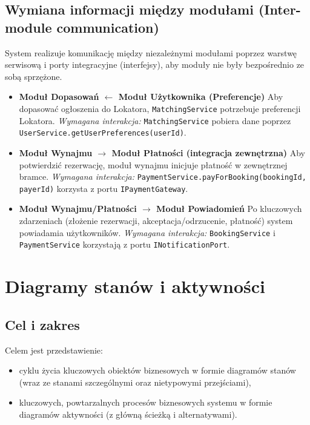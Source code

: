 \documentclass[11pt, a4paper]{article}
\begin{document}
\subsection{Wymiana informacji między modułami (Inter-module communication)}
System realizuje komunikację między niezależnymi modułami poprzez warstwę serwisową i porty integracyjne (interfejsy), aby moduły nie były bezpośrednio ze sobą sprzężone.

\begin{itemize}
    \item \textbf{Moduł Dopasowań $\leftarrow$ Moduł Użytkownika (Preferencje)}
    \newline
    Aby dopasować ogłoszenia do Lokatora, \texttt{MatchingService} potrzebuje preferencji Lokatora.
    \newline
    \textit{Wymagana interakcja:} \texttt{MatchingService} pobiera dane poprzez \texttt{UserService.getUserPreferences(userId)}.

    \item \textbf{Moduł Wynajmu $\rightarrow$ Moduł Płatności (integracja zewnętrzna)}
    \newline
    Aby potwierdzić rezerwację, moduł wynajmu inicjuje płatność w zewnętrznej bramce.
    \newline
    \textit{Wymagana interakcja:} \texttt{PaymentService.payForBooking(bookingId, payerId)} korzysta z portu \texttt{IPaymentGateway}.

    \item \textbf{Moduł Wynajmu/Płatności $\rightarrow$ Moduł Powiadomień}
    \newline
    Po kluczowych zdarzeniach (złożenie rezerwacji, akceptacja/odrzucenie, płatność) system powiadamia użytkowników.
    \newline
    \textit{Wymagana interakcja:} \texttt{BookingService} i \texttt{PaymentService} korzystają z portu \texttt{INotificationPort}.
\end{itemize}

\section{Diagramy stanów i aktywności}

\subsection{Cel i zakres}
Celem jest przedstawienie:
\begin{itemize}
  \item cyklu życia kluczowych obiektów biznesowych w formie diagramów stanów (wraz ze stanami szczególnymi oraz nietypowymi przejściami),
  \item kluczowych, powtarzalnych procesów biznesowych systemu w formie diagramów aktywności (z główną ścieżką i alternatywami).
\end{itemize}
\end{document}
